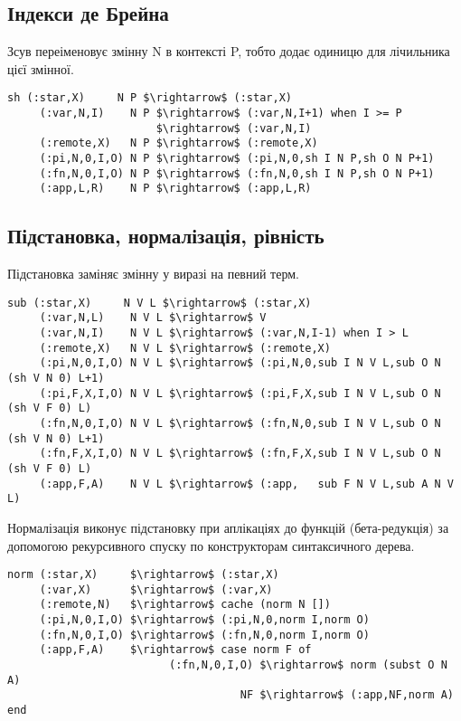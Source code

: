 \subsection*{Індекси де Брейна}
Зсув переіменовує змінну N в контексті P, тобто додає одиницю для лічильника цієї змінної.

\begin{lstlisting}[mathescape=true]
  sh (:star,X)     N P $\rightarrow$ (:star,X)
     (:var,N,I)    N P $\rightarrow$ (:var,N,I+1) when I >= P
                       $\rightarrow$ (:var,N,I)
     (:remote,X)   N P $\rightarrow$ (:remote,X)
     (:pi,N,0,I,O) N P $\rightarrow$ (:pi,N,0,sh I N P,sh O N P+1)
     (:fn,N,0,I,O) N P $\rightarrow$ (:fn,N,0,sh I N P,sh O N P+1)
     (:app,L,R)    N P $\rightarrow$ (:app,L,R)
\end{lstlisting}

\subsection*{Підстановка, нормалізація, рівність}
Підстановка заміняє змінну у виразі на певний терм.

\begin{lstlisting}[mathescape=true]
 sub (:star,X)     N V L $\rightarrow$ (:star,X)
     (:var,N,L)    N V L $\rightarrow$ V
     (:var,N,I)    N V L $\rightarrow$ (:var,N,I-1) when I > L
     (:remote,X)   N V L $\rightarrow$ (:remote,X)
     (:pi,N,0,I,O) N V L $\rightarrow$ (:pi,N,0,sub I N V L,sub O N (sh V N 0) L+1)
     (:pi,F,X,I,O) N V L $\rightarrow$ (:pi,F,X,sub I N V L,sub O N (sh V F 0) L)
     (:fn,N,0,I,O) N V L $\rightarrow$ (:fn,N,0,sub I N V L,sub O N (sh V N 0) L+1)
     (:fn,F,X,I,O) N V L $\rightarrow$ (:fn,F,X,sub I N V L,sub O N (sh V F 0) L)
     (:app,F,A)    N V L $\rightarrow$ (:app,   sub F N V L,sub A N V L)
\end{lstlisting}

Нормалізація виконує підстановку при аплікаціях до функцій (бета-редукція)
за допомогою рекурсивного спуску по конструкторам синтаксичного дерева.

\begin{lstlisting}[mathescape=true]
norm (:star,X)     $\rightarrow$ (:star,X)
     (:var,X)      $\rightarrow$ (:var,X)
     (:remote,N)   $\rightarrow$ cache (norm N [])
     (:pi,N,0,I,O) $\rightarrow$ (:pi,N,0,norm I,norm O)
     (:fn,N,0,I,O) $\rightarrow$ (:fn,N,0,norm I,norm O)
     (:app,F,A)    $\rightarrow$ case norm F of
                         (:fn,N,0,I,O) $\rightarrow$ norm (subst O N A)
                                    NF $\rightarrow$ (:app,NF,norm A) end
\end{lstlisting}

